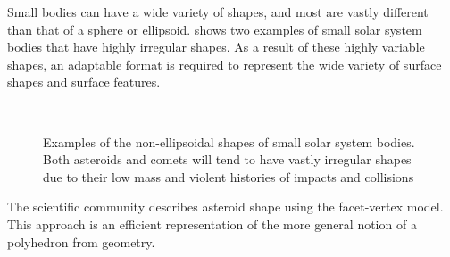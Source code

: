 Small bodies can have a wide variety of shapes, and most are vastly different than that of a sphere or ellipsoid.
 shows two examples of small solar system bodies that have highly irregular shapes.
As a result of these highly variable shapes, an adaptable format is required to represent the wide variety of surface shapes and surface features.
\begin{figure}[h]
    \centering
    ~
    \caption[Irregularly Shaped Asteroids]{Examples of the non-ellipsoidal shapes of small solar system bodies. Both asteroids and comets will tend to have vastly irregular shapes due to their low mass and violent histories of impacts and collisions~\label{fig:irregular_asteroids}}
\end{figure}
The scientific community describes asteroid shape using the facet-vertex model.
This approach is an efficient representation of the more general notion of a polyhedron from geometry.

